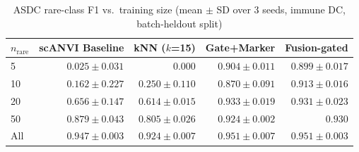 \begin{table}[h]
\centering
\small
\caption{ASDC rare-class F1 vs.\ training size (mean $\pm$ SD over 3 seeds, immune DC, batch-heldout split)}
\begin{tabular}{lrrrr}
\hline
$n_\text{rare}$ & scANVI Baseline & kNN ($k$=15) & \textbf{Gate+Marker} & \textbf{Fusion-gated} \\
\hline
5 & $0.025 \pm 0.031$ & $0.000$ & \textbf{$0.904 \pm 0.011$} & $0.899 \pm 0.017$ \\
10 & $0.162 \pm 0.227$ & $0.250 \pm 0.110$ & $0.870 \pm 0.091$ & \textbf{$0.913 \pm 0.016$} \\
20 & $0.656 \pm 0.147$ & $0.614 \pm 0.015$ & \textbf{$0.933 \pm 0.019$} & $0.931 \pm 0.023$ \\
50 & $0.879 \pm 0.043$ & $0.805 \pm 0.026$ & $0.924 \pm 0.002$ & \textbf{$0.930$} \\
All & $0.947 \pm 0.003$ & $0.924 \pm 0.007$ & \textbf{$0.951 \pm 0.007$} & $0.951 \pm 0.003$ \\
\hline
\end{tabular}
\label{tab:asdc_ablation}
\end{table}
